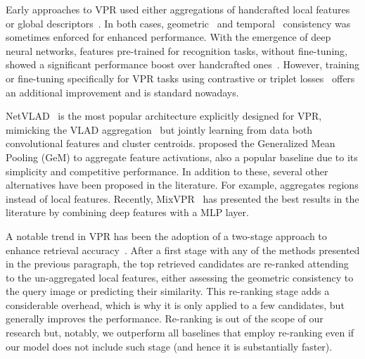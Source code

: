 \documentclass[10pt,twocolumn,letterpaper]{article}
\begin{document}
Early approaches to VPR used either aggregations of handcrafted local features~\cite{cummins2008fab,jegou2010aggregating,arandjelovic2013all} or global descriptors~\cite{sunderhauf2011brief,murillo2012localization}. In both cases, geometric~\cite{galvez2012bags} and temporal~\cite{galvez2012bags,milford2012seqslam} consistency was sometimes enforced for enhanced performance. With the emergence of deep neural networks, features pre-trained for recognition tasks, without fine-tuning, showed a significant performance boost over handcrafted ones~\cite{sunderhauf2015performance}. However, training or fine-tuning specifically for VPR tasks using contrastive or triplet losses~\cite{musgrave2020metric} offers an additional improvement and is standard nowadays.

NetVLAD~\cite{arandjelovic2016netvlad} is the most popular architecture explicitly designed for VPR, mimicking the VLAD aggregation~\cite{jegou2010aggregating} but jointly learning from data both convolutional features and cluster centroids. \citet{radenovic2018fine} proposed the Generalized Mean Pooling (GeM) to aggregate feature activations, also a popular baseline due to its simplicity and competitive performance. In addition to these, several other alternatives have been proposed in the literature. For example, \citet{teichmann2019detect} aggregates regions instead of local features. Recently, MixVPR~\cite{ali2023mixvpr} has presented the best results in the literature by combining deep features with a MLP layer. 

A notable trend in VPR has been the adoption of a two-stage approach to enhance retrieval accuracy~\cite{taira2018inloc,sarlin2019coarse,cao2020unifying,hausler2021patch,shao2023global,zhu2023r2former}. After a first stage with any of the methods presented in the previous paragraph, the top retrieved candidates are re-ranked attending to the un-aggregated local features, either assessing the geometric consistency to the query image or predicting their similarity. This re-ranking stage adds a considerable overhead, which is why it is only applied to a few candidates, but generally improves the performance. Re-ranking is out of the scope of our research but, notably, we outperform all baselines that employ re-ranking even if our model does not include such stage (and hence it is substantially faster).
\end{document}
